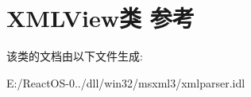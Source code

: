 \hypertarget{class_x_m_l_view}{}\section{X\+M\+L\+View类 参考}
\label{class_x_m_l_view}


该类的文档由以下文件生成\+:\begin{DoxyCompactItemize}
\item 
E\+:/\+React\+O\+S-\/0../dll/win32/msxml3/xmlparser.\+idl\end{DoxyCompactItemize}
